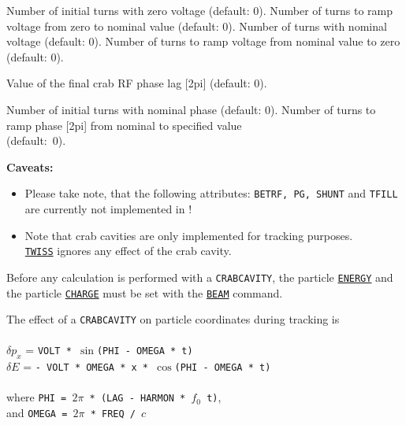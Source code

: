 {\begin{madlist}  
   Number of initial turns with zero voltage (default: 0). 
   Number of turns to ramp voltage from zero to nominal value (default: 0). 
   Number of turns with nominal voltage (default: 0). 
   Number of turns to ramp voltage from nominal value to zero (default: 0).  

   Value of the final crab RF phase lag [2pi] (default: 0).

   Number of initial turns with nominal phase (default: 0). 
   Number of turns to ramp phase [2pi] from nominal to
    specified value \\ (default:~0). 

\end{madlist}

{\bf Caveats:}
\begin{itemize}
   \item Please take note, that the following \madeight attributes:
     {\tt BETRF, PG, SHUNT} and {\tt TFILL} are currently not implemented in 
     \madx!
   \item Note that crab cavities are only implemented for
     tracking  purposes. \\ \hyperref[chap:twiss]{\tt TWISS} ignores any effect 
     of the crab cavity.  
\end{itemize} 


Before any calculation is performed with a {\tt CRABCAVITY}, the particle
\hyperref[sec:beam]{\tt ENERGY} and the particle \hyperref[sec:beam]{\tt CHARGE} 
must be set with the \hyperref[sec:beam]{\tt BEAM} command.   

The effect of a {\tt CRABCAVITY} on particle coordinates during tracking is
\\
\\ $\delta p_x$  = {\tt VOLT * }$\sin${\tt(PHI - OMEGA * t)} 
\\ $\delta E$  = {\tt- VOLT * OMEGA * x * }$\cos${\tt(PHI - OMEGA * t)} 
\\ 
\\ where {\tt PHI =  $2\pi$ * (LAG - HARMON * $f_0$ t)}, 
\\ and {\tt OMEGA = $2\pi$ * FREQ / $c$}
\\


}
